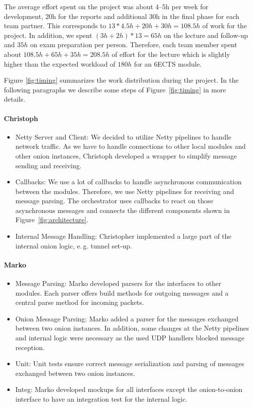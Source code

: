 \documentclass[paper=letter, fontsize=12pt]{article}
\begin{document}
\noindent
The average effort spent on the project was about 4--5h per week for development, 20h for the reports and additional 30h in the final phase for each team partner.
This corresponds to $13 * 4.5h + 20h + 30h = 108.5h$ of work for the project.
In addition, we spent $(3h + 2h) * 13 = 65h$ on the lecture and follow-up and $35h$ on exam preparation per person.
Therefore, each team member spent about $108.5h + 65h + 35h = 208.5h$ of effort for the lecture which is slightly higher than the expected workload of $180h$ for an 6ECTS module.

Figure \ref{fig:timing} summarizes the work distribution during the project.
In the following paragraphs we describe some steps of Figure~\ref{fig:timing} in more details.
\paragraph{Christoph}
    \begin{itemize}
        \item Netty Server and Client: We decided to utilize Netty pipelines to handle network traffic. As we have to handle connections to other local modules and other onion instances, Christoph developed a wrapper to simplify message sending and receiving.
        \item Callbacks: We use a lot of callbacks to handle asynchronous communication between the modules. Therefore, we use Netty pipelines for receiving and message parsing. The orchestrator uses callbacks to react on those asynchronous messages and connects the different components shown in Figure~\ref{fig:architecture}.
        \item Internal Message Handling: Christopher implemented a large part of the internal onion logic, e.\,g. tunnel set-up.
    \end{itemize}
\paragraph{Marko}
    \begin{itemize}
        \item Message Parsing: Marko developed parsers for the interfaces to other modules. Each parser offers build methods for outgoing messages and a central parse method for incoming packets. 
        \item Onion Message Parsing: Marko added a parser for the messages exchanged between two onion instances. In addition, some changes at the Netty pipelines and internal logic were necessary as the used UDP handlers blocked message reception.
        \item Unit: Unit tests ensure correct message serialization and parsing of messages exchanged between two onion instances.
        \item Integ: Marko developed mockups for all interfaces except the onion-to-onion interface to have an integration test for the internal logic.
    \end{itemize}
\end{document}
